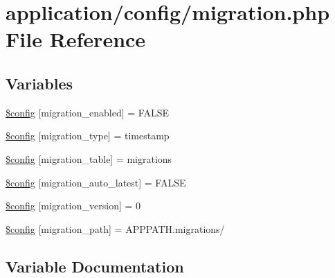 \hypertarget{application_2config_2migration_8php}{}\section{application/config/migration.php File Reference}
\label{application_2config_2migration_8php}
\subsection*{Variables}
\begin{DoxyCompactItemize}
\item 
\mbox{\hyperlink{application_2config_2migration_8php_a769784fcf4b9c465dd96ad7e01bf0a9f}{\$config}} \mbox{[}\textquotesingle{}migration\+\_\+enabled\textquotesingle{}\mbox{]} = F\+A\+L\+SE
\item 
\mbox{\hyperlink{application_2config_2migration_8php_a8ee76568d51cffa460c623e8d8dc3166}{\$config}} \mbox{[}\textquotesingle{}migration\+\_\+type\textquotesingle{}\mbox{]} = \textquotesingle{}timestamp\textquotesingle{}
\item 
\mbox{\hyperlink{application_2config_2migration_8php_af06715c5264f93cc01f7ee2d17cf68f6}{\$config}} \mbox{[}\textquotesingle{}migration\+\_\+table\textquotesingle{}\mbox{]} = \textquotesingle{}migrations\textquotesingle{}
\item 
\mbox{\hyperlink{application_2config_2migration_8php_ac265f0acf3f7bbdd953c5b6f91d70479}{\$config}} \mbox{[}\textquotesingle{}migration\+\_\+auto\+\_\+latest\textquotesingle{}\mbox{]} = F\+A\+L\+SE
\item 
\mbox{\hyperlink{application_2config_2migration_8php_aef268362fc4bdb038fb0b71df8bf9a94}{\$config}} \mbox{[}\textquotesingle{}migration\+\_\+version\textquotesingle{}\mbox{]} = 0
\item 
\mbox{\hyperlink{application_2config_2migration_8php_a780eb2c71713803ffac5e0ef35c11d81}{\$config}} \mbox{[}\textquotesingle{}migration\+\_\+path\textquotesingle{}\mbox{]} = A\+P\+P\+P\+A\+T\+H.\textquotesingle{}migrations/\textquotesingle{}
\end{DoxyCompactItemize}


\subsection{Variable Documentation}
\mbox{\label{application_2config_2migration_8php_a769784fcf4b9c465dd96ad7e01bf0a9f}} 
